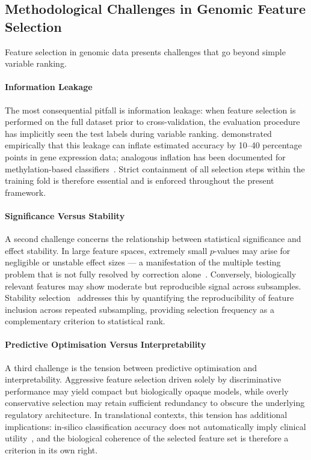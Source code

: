 \subsection{Methodological Challenges in Genomic Feature Selection}
\label{subsec:fs_stability}
Feature selection in genomic data presents challenges that go beyond 
simple variable ranking.

\paragraph{Information Leakage}
The most consequential pitfall is information leakage: when feature 
selection is performed on the full dataset prior to cross-validation, 
the evaluation procedure has implicitly seen the test labels during 
variable ranking. \cite{Ambroise2002} demonstrated empirically that 
this leakage can inflate estimated accuracy by 10–40 percentage points 
in gene expression data; analogous inflation has been documented for 
methylation-based classifiers~\cite{Smialowski2010}. Strict containment 
of all selection steps within the training fold is therefore essential 
and is enforced throughout the present framework.

\paragraph{Significance Versus Stability}
A second challenge concerns the relationship between statistical 
significance and effect stability. In large feature spaces, extremely 
small $p$-values may arise for negligible or unstable effect sizes — a 
manifestation of the multiple testing problem that is not fully 
resolved by correction alone~\cite{Gelman2014}. Conversely, 
biologically relevant features may show moderate but reproducible 
signal across subsamples. Stability selection~\cite{Meinshausen2010} 
addresses this by quantifying the reproducibility of feature inclusion 
across repeated subsampling, providing selection frequency as a 
complementary criterion to statistical rank.

\paragraph{Predictive Optimisation Versus Interpretability}
A third challenge is the tension between predictive optimisation and 
interpretability. Aggressive feature selection driven solely by 
discriminative performance may yield compact but biologically opaque 
models, while overly conservative selection may retain sufficient 
redundancy to obscure the underlying regulatory architecture. In 
translational contexts, this tension has additional implications: 
in-silico classification accuracy does not automatically imply 
clinical utility~\cite{Poste2011}, and the biological coherence of 
the selected feature set is therefore a criterion in its own right.


